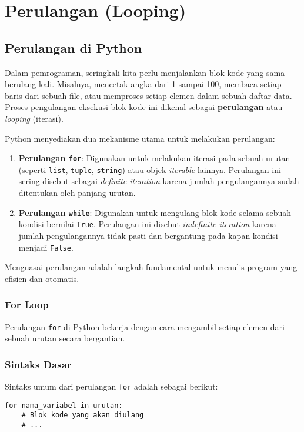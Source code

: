 \chapter{Perulangan (Looping)}

\section{Perulangan di Python}
Dalam pemrograman, seringkali kita perlu menjalankan blok kode yang sama berulang kali. 
Misalnya, mencetak angka dari 1 sampai 100, membaca setiap baris dari sebuah file, atau 
memproses setiap elemen dalam sebuah daftar data. 
Proses pengulangan eksekusi blok kode ini dikenal sebagai \textbf{perulangan} atau \textit{looping} (iterasi).

Python menyediakan dua mekanisme utama untuk melakukan perulangan:
\begin{enumerate}
    \item \textbf{Perulangan \texttt{for}}: Digunakan untuk melakukan iterasi pada sebuah urutan (seperti \texttt{list}, \texttt{tuple}, \texttt{string}) atau objek \textit{iterable} lainnya. Perulangan ini sering disebut sebagai \textit{definite iteration} karena jumlah pengulangannya sudah ditentukan oleh panjang urutan.
    \item \textbf{Perulangan \texttt{while}}: Digunakan untuk mengulang blok kode selama sebuah kondisi bernilai \texttt{True}. Perulangan ini disebut \textit{indefinite iteration} karena jumlah pengulangannya tidak pasti dan bergantung pada kapan kondisi menjadi \texttt{False}.
\end{enumerate}

Menguasai perulangan adalah langkah fundamental untuk menulis program yang efisien dan otomatis.

\subsection{For Loop}

Perulangan \texttt{for} di Python bekerja dengan cara mengambil setiap elemen dari sebuah urutan secara bergantian.

\subsection{Sintaks Dasar}
Sintaks umum dari perulangan \texttt{for} adalah sebagai berikut:
\begin{lstlisting}[style=PythonStyle, caption={Sintaks Dasar Perulangan for}]
for nama_variabel in urutan:
    # Blok kode yang akan diulang
    # ...
\end{lstlisting}

